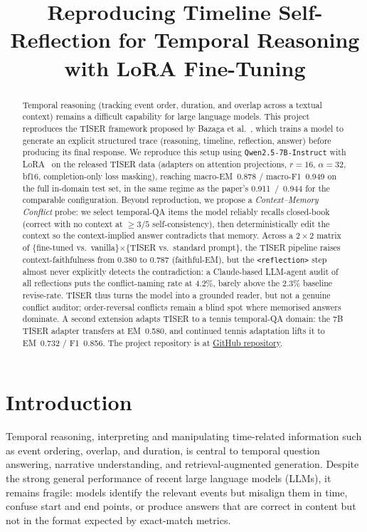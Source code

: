 \documentclass[conference]{IEEEtran}
\title{Reproducing Timeline Self-Reflection for Temporal Reasoning with LoRA Fine-Tuning}
\author{
\IEEEauthorblockN{
Gabriele Adorni s349308,
Alessandro Casadei s349386, \\
Taha Atabay Cetin s349501,
}
\IEEEauthorblockA{
Politecnico di Torino\\
Deep Natural Language Processing\\
}
}
\begin{document}
\maketitle

\begin{abstract}
Temporal reasoning (tracking event order, duration, and overlap across a textual context) remains a difficult capability for large language models. This project reproduces the TISER framework proposed by Bazaga et al.~\cite{bazaga2025tiser}, which trains a model to generate an explicit structured trace (reasoning, timeline, reflection, answer) before producing its final response. We reproduce this setup using \texttt{Qwen2.5-7B-Instruct} with LoRA~\cite{hu2022lora} on the released TISER data (adapters on attention projections, $r{=}16$, $\alpha{=}32$, bf16, completion-only loss masking), reaching macro-EM~0.878 / macro-F1~0.949 on the full in-domain test set, in the same regime as the paper's 0.911~/~0.944 for the comparable configuration. Beyond reproduction, we propose a \emph{Context--Memory Conflict} probe: we select temporal-QA items the model reliably recalls closed-book (correct with no context at ${\geq}3/5$ self-consistency), then deterministically edit the context so the context-implied answer contradicts that memory. Across a $2{\times}2$ matrix of \{fine-tuned vs.\ vanilla\}${\times}$\{TISER vs.\ standard prompt\}, the TISER pipeline raises context-faithfulness from 0.380 to 0.787 (faithful-EM), but the \texttt{<reflection>} step almost never explicitly detects the contradiction: a Claude-based LLM-agent audit of all reflections puts the conflict-naming rate at 4.2\%, barely above the 2.3\% baseline revise-rate. TISER thus turns the model into a grounded reader, but not a genuine conflict auditor; order-reversal conflicts remain a blind spot where memorised answers dominate. A second extension adapts TISER to a tennis temporal-QA domain: the 7B TISER adapter transfers at EM~0.580, and continued tennis adaptation lifts it to EM~0.732 / F1~0.856.
The project repository is at \href{https://github.com/thestbobo/tiser_temporal_reasoning_extension}{GitHub repository}.
\end{abstract}

\section{Introduction}

Temporal reasoning, interpreting and manipulating time-related information such as event ordering, overlap, and duration, is central to temporal question answering, narrative understanding, and retrieval-augmented generation. Despite the strong general performance of recent large language models (LLMs), it remains fragile: models identify the relevant events but misalign them in time, confuse start and end points, or produce answers that are correct in content but not in the format expected by exact-match metrics.
\end{document}

